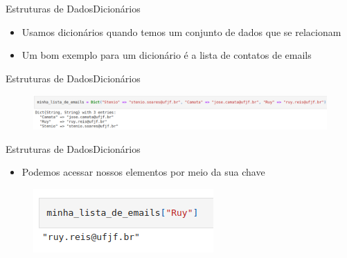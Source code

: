 \documentclass{beamer}
\begin{document}
\begin{frame}{Estruturas de Dados}{Dicionários}
    \begin{itemize}
        \item Usamos dicionários quando temos um conjunto de dados que se relacionam
        \item Um bom exemplo para um dicionário é a lista de contatos de emails
    \end{itemize}
\end{frame}

\begin{frame}{Estruturas de Dados}{Dicionários}
    \begin{figure}
        \centering
        \includegraphics[scale=0.3]{imagens/dicionario01.png}
        \label{fig:my_label}
    \end{figure}
\end{frame}

\begin{frame}{Estruturas de Dados}{Dicionários}
    \begin{itemize}
        \item Podemos acessar nossos elementos por meio da sua chave
    \end{itemize}
    \begin{figure}
        \centering
        \includegraphics[scale=0.4]{imagens/dicionario02.png}
        \label{fig:my_label}
    \end{figure}
\end{frame}
\end{document}
